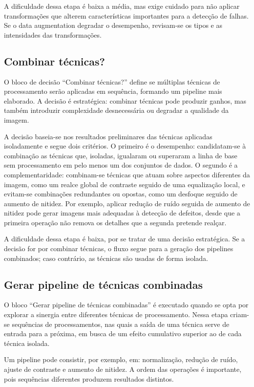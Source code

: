 A dificuldade dessa etapa é baixa a média, mas exige cuidado para não aplicar transformações que alterem características importantes para a detecção de falhas. Se o data augmentation degradar o desempenho, revisam-se os tipos e as intensidades das transformações.

\subsection{Combinar técnicas?}
O bloco de decisão ``Combinar técnicas?'' define se múltiplas técnicas de processamento serão aplicadas em sequência, formando um pipeline mais elaborado. A decisão é estratégica: combinar técnicas pode produzir ganhos, mas também introduzir complexidade desnecessária ou degradar a qualidade da imagem.

A decisão baseia-se nos resultados preliminares das técnicas aplicadas isoladamente e segue dois critérios. O primeiro é o desempenho: candidatam-se à combinação as técnicas que, isoladas, igualaram ou superaram a linha de base sem processamento em pelo menos um dos conjuntos de dados. O segundo é a complementaridade: combinam-se técnicas que atuam sobre aspectos diferentes da imagem, como um realce global de contraste seguido de uma equalização local, e evitam-se combinações redundantes ou opostas, como um desfoque seguido de aumento de nitidez. Por exemplo, aplicar redução de ruído seguida de aumento de nitidez pode gerar imagens mais adequadas à detecção de defeitos, desde que a primeira operação não remova os detalhes que a segunda pretende realçar.

A dificuldade dessa etapa é baixa, por se tratar de uma decisão estratégica. Se a decisão for por combinar técnicas, o fluxo segue para a geração dos pipelines combinados; caso contrário, as técnicas são usadas de forma isolada.

\subsection{Gerar pipeline de técnicas combinadas}
O bloco ``Gerar pipeline de técnicas combinadas'' é executado quando se opta por explorar a sinergia entre diferentes técnicas de processamento. Nessa etapa criam-se sequências de processamentos, nas quais a saída de uma técnica serve de entrada para a próxima, em busca de um efeito cumulativo superior ao de cada técnica isolada.

Um pipeline pode consistir, por exemplo, em: normalização, redução de ruído, ajuste de contraste e aumento de nitidez. A ordem das operações é importante, pois sequências diferentes produzem resultados distintos.

